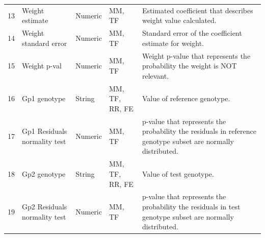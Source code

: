 \documentclass[12pt,a4paper]{article}
\begin{document}
\begin{table}
\begin{tabular}{| l | l | l | l | p{10cm} |}
13&Weight estimate&Numeric&MM, TF&Estimated coefficient that describes weight value calculated.\\
14&Weight standard error&Numeric&MM, TF&Standard error of the coefficient estimate for weight.\\
15&Weight p-val&Numeric&MM, TF&Weight p-value that represents the probability the weight is NOT relevant.\\
16&Gp1 genotype&String&MM, TF, RR, FE&Value of reference genotype.\\
17&Gp1 Residuals normality test&Numeric&MM, TF&p-value that represents the probability the residuals in reference genotype subset are normally distributed.\\
18&Gp2 genotype&String&MM, TF, RR, FE&Value of test genotype.\\
19&Gp2 Residuals normality test&Numeric&MM, TF&p-value that represents the probability the residuals in test genotype subset are normally distributed.\\
\hline  
\end{tabular}
\end{table}
\end{document}

